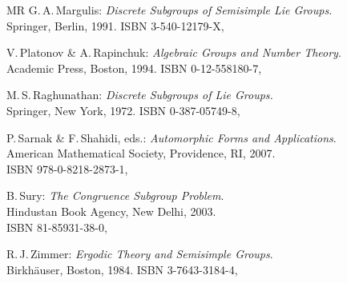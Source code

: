\begin{references}{MR}
 G.\,A.\,Margulis:
 \emph{Discrete Subgroups of Semisimple Lie Groups.}
\\ Springer, {Berlin}, 1991.
\quad ISBN 3-540-12179-X,


 V.\,Platonov \& A.\,Rapinchuk: 
 \emph{Algebraic Groups and Number Theory}.%
 \\ Academic Press, Boston, 1994.
 \quad ISBN 0-12-558180-7,

 M.\,S.\,Raghunathan: 
 \emph{Discrete Subgroups of Lie Groups.}
 \\ Springer, {New York}, 1972.
\quad ISBN 0-387-05749-8,

P.\,Sarnak \& F.\,Shahidi, eds.:
\emph{Automorphic Forms and Applications}.%
\\American Mathematical Society, Providence, RI, 
2007. 
\\ ISBN 978-0-8218-2873-1,


B.\,Sury:
\emph{The Congruence Subgroup Problem}. 
\\Hindustan Book Agency, New Delhi, 2003. 
\\ ISBN 81-85931-38-0,

 R.\,J.\,Zimmer:
 \emph{Ergodic Theory and Semisimple Groups}.
 \\ Birkh\"auser, Boston, 1984.
\quad ISBN 3-7643-3184-4,

\end{references}

\vfil
 \eject

